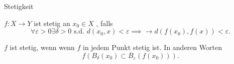 \documentclass[class=article, crop=false]{standalone}
\begin{document}
\begin{zettel}{Stetigkeit}
\begin{flashcard}
\begin{mdframed}
\vspace*{-8pt}
\begin{definition}[Stetigkeit]
    $f:X \longrightarrow Y$ ist stetig an $x_0 \in  X$ , falls
\[
    \forall \varepsilon >  0 \exists  \delta  > 0 \text{ s.d. }  d (x_0 , x) < \varepsilon \implies \longrightarrow  d (f (x_0), f (x)) <  \varepsilon
.\]

    $f$ ist stetig, wenn wenn $f$ in jedem Punkt stetig ist.
    In anderen Worten
\[
    f (B_{\delta }(x_0) \subset B_{\varepsilon } (f (x_0)) )
.\]
\end{definition}
\end{mdframed}
\end{flashcard}
\end{zettel}
\end{document}
